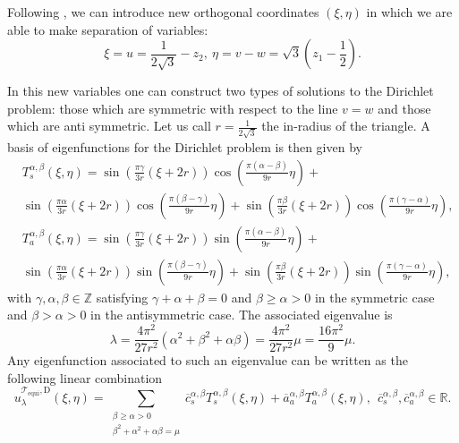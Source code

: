 \documentclass{amsart}
\theoremstyle{definition}
\theoremstyle{remark}
\renewcommand\geq\geqslant
\numberwithin{equation}{section}
\theoremstyle{definition}
\theoremstyle{remark}
\begin{document}
Following \cite{trigI}, we can introduce new orthogonal coordinates $(\xi,\eta)$ in which we are able to make separation of variables: \begin{equation}
	\xi=u=\frac{1}{2\sqrt{3}}-z_2,\ \eta=v-w=\sqrt{3}\left(z_1-\frac{1}{2}\right).
\end{equation}

In this new variables one can construct two types of solutions to the Dirichlet problem: those which are symmetric with respect to the line $v=w$ and those which are anti symmetric. Let us call $r=\frac{1}{2\sqrt{3}}$ the in-radius of the triangle. A basis of eigenfunctions for the Dirichlet problem is then given by 
\begin{equation}
	\begin{aligned}
		&	T_s^{\alpha,\beta}(\xi,\eta)=\sin\left(\frac{\pi \gamma}{3r}\left(\xi+2r\right)\right)\cos\left(\frac{\pi(\alpha-\beta)}{9r}\eta\right)+\\&\sin\left(\frac{\pi \alpha}{3r}\left(\xi+2r\right)\right)\cos\left(\frac{\pi(\beta-\gamma)}{9r}\eta\right)+\sin\left(\frac{\pi \beta}{3r}\left(\xi+2r\right)\right)\cos\left(\frac{\pi(\gamma-\alpha)}{9r}\eta\right),
		\\&	T_a^{\alpha,\beta}(\xi,\eta)=\sin\left(\frac{\pi \gamma}{3r}\left(\xi+2r\right)\right)\sin\left(\frac{\pi(\alpha-\beta)}{9r}\eta\right)+\\&\sin\left(\frac{\pi \alpha}{3r}\left(\xi+2r\right)\right)\sin\left(\frac{\pi(\beta-\gamma)}{9r}\eta\right)+\sin\left(\frac{\pi \beta}{3r}\left(\xi+2r\right)\right)\sin\left(\frac{\pi(\gamma-\alpha)}{9r}\eta\right),
	\end{aligned}
\end{equation}with $\gamma,\alpha,\beta\in\mathbb{Z}$ satisfying $\gamma+\alpha+\beta=0$ and $\beta\geq \alpha>0$ in the symmetric case and $\beta>\alpha>0$ in the antisymmetric case. The associated eigenvalue is\begin{equation}
	\lambda=\frac{4\pi^2}{27r^2}(\alpha^2+\beta^2+\alpha\beta)=\frac{4\pi^2}{27r^2}\mu=\frac{16\pi^2}{9}\mu.
\end{equation}Any eigenfunction associated to such an eigenvalue can be written as the following linear combination\begin{equation}
	u_\lambda^{\mathcal{T}_\mathrm{equi},\mathrm{D}}(\xi,\eta)=\sum_{\substack{\beta \geq \alpha>0 \\ \beta^2+\alpha^2+\alpha\beta=\mu}}\overline{c}_s^{\alpha,\beta}T_s^{\alpha,\beta}(\xi,\eta)+\overline{a}_a^{\alpha,\beta}T_a^{\alpha,\beta}(\xi,\eta),\ \ \overline{c}_s^{\alpha,\beta},\overline{c}_a^{\alpha,\beta}\in\mathbb{R}.
\end{equation}
\end{document}
